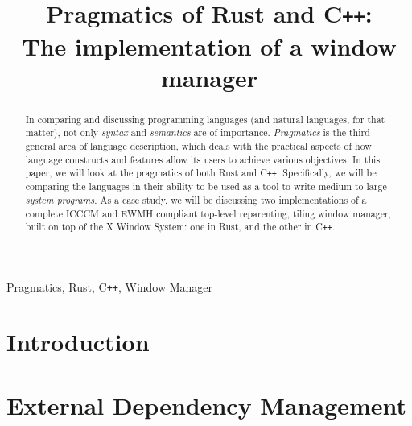 \documentclass[conference]{IEEEtran}
\begin{document}
\title{Pragmatics of Rust and C\texttt{++}:\\The implementation of a window manager\\
}

\author{
}

\maketitle

\begin{abstract}

In comparing  and discussing programming  languages (and natural  languages, for
that matter), not only \textit{syntax} and \textit{semantics} are of importance.
\textit{Pragmatics} is  the third  general area  of language  description, which
deals with the  practical aspects of how language constructs  and features allow
its users  to achieve  various objectives. In  this paper, we  will look  at the
pragmatics of  both Rust  and C\texttt{++}. Specifically,  we will  be comparing
the  languages in  their  ability  to be  used  as a  tool  to  write medium  to
large  \textit{system programs}.  As a  case study,  we will  be discussing  two
implementations of  a complete ICCCM  and EWMH compliant  top-level reparenting,
tiling window manager, built on top of the X Window System: one in Rust, and the
other in C\texttt{++}.
\end{abstract}

\begin{IEEEkeywords}
	Pragmatics, Rust, C\texttt{++}, Window Manager
\end{IEEEkeywords}

\section{Introduction}
{ \textcolor{gray}\blindtext }

\section{External Dependency Management}
{ \textcolor{gray}\blindtext }
\end{document}
